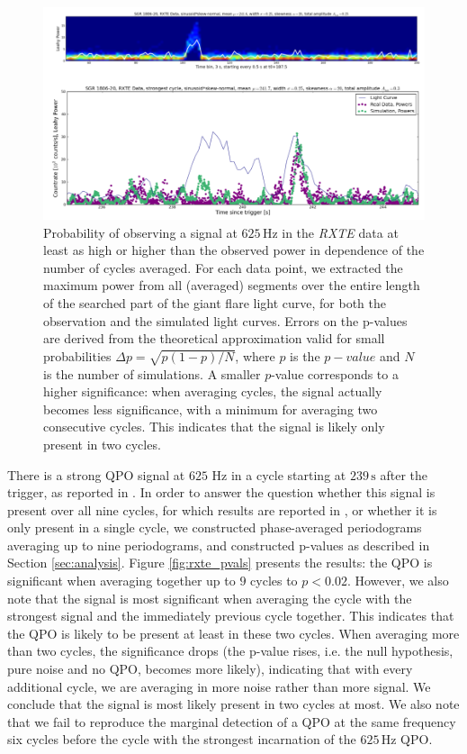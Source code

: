 \documentclass{emulateapj}
\begin{document}
\begin{figure}[htbp]
\begin{center}
\includegraphics[width=\textwidth]{1806_rxte_lc_combined.png}
\caption{Probability of observing a signal at $625 \, \mathrm{Hz}$ in the {\it RXTE} data at least as high or higher than the observed power in dependence of the number of cycles averaged. For each data point, we extracted the maximum power from all (averaged) segments over the entire length of the searched part of the giant flare light curve, for both the observation and the simulated light curves. Errors on the p-values are derived from the theoretical approximation valid for small probabilities $\Delta p = \sqrt{p (1-p)/N}$, where $p$ is the $p-value$ and $N$ is the number of simulations. A smaller $p$-value corresponds to a higher significance: when averaging cycles, the signal actually becomes less significance, with a minimum for averaging two consecutive cycles. This indicates that the signal is likely only present in two cycles.}
\label{fig:rxte_lc_combined}
\end{center}
\end{figure}


There is a strong QPO signal at $625$ Hz in a cycle starting at $239\, \mathrm{s}$ after the trigger, as reported in \citet{Strohmayer06}. In order to answer the question whether this signal is present over all nine cycles, for which results are reported in \citet{Strohmayer05}, or whether it is only present in a single cycle, we constructed phase-averaged periodograms averaging up to nine periodograms, and constructed p-values as described in Section \ref{sec:analysis}. Figure \ref{fig:rxte_pvals} presents the results: the QPO is significant when averaging together up to $9$ cycles to $p < 0.02$. However, we also note that the signal is most significant when averaging the cycle with the strongest signal and the immediately previous cycle together. This indicates that the QPO is likely to be present at least in these two cycles. When averaging more than two cycles, the significance drops (the p-value rises, i.e. the null hypothesis, pure noise and no QPO, becomes more likely), indicating that with every additional cycle, we are averaging in more noise rather than more signal. We conclude that the signal is most likely present in two cycles at most.
We also note that we fail to reproduce the marginal detection of a QPO at the same frequency six cycles before the cycle with the strongest incarnation of the $625\, \mathrm{Hz}$ QPO. 
\end{document}

